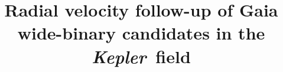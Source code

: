 %
%
%
%


\newcommand{\Kepler}{{\it Kepler}}
\newcommand{\kepler}{{\it Kepler}}
\newcommand{\gaia}{{\it Gaia}}
\newcommand{\Gaia}{{\it Gaia}}
\newcommand{\TGAS}{{\it TGAS}}
\newcommand{\tgas}{{\it TGAS}}



%
%

\title{Radial velocity follow-up of Gaia wide-binary candidates in the
\Kepler\ field}

%
%
%

\begin{PI}
\end{PI}

\begin{CoI}
\end{CoI}

\begin{CoI}
\end{CoI}

